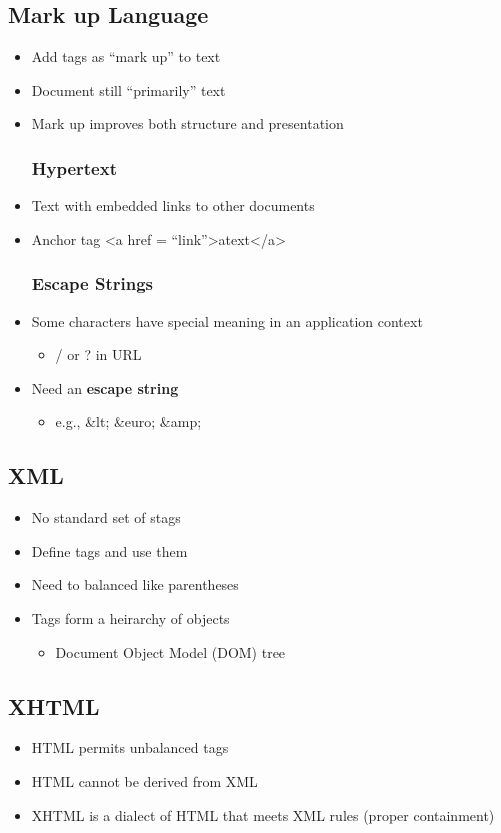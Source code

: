 \subsection{Mark up Language}
\begin{itemize}
	\item Add tags as ``mark up'' to text
	\item Document still ``primarily'' text
	\item Mark up improves both structure and presentation
	\subsubsection{Hypertext}
	\item Text with embedded links to other documents
	\item Anchor tag <a href = ``link''>atext</a>
	\subsubsection{Escape Strings}
	\item Some characters have special meaning in an application context
	\begin{itemize}
		\item / or ? in URL
	\end{itemize}
	\item Need an \textbf{escape string}
	\begin{itemize}
		\item e.g., \&lt; \&euro; \&amp;
	\end{itemize}
\end{itemize}

\subsection{XML}
\begin{itemize}
	\item No standard set of stags
	\item Define tags and use them
	\item Need to balanced like parentheses
	\item Tags form a heirarchy of objects
	\begin{itemize}
		\item Document Object Model (DOM) tree
	\end{itemize}
\end{itemize}

\subsection{XHTML}
\begin{itemize}
	\item HTML permits unbalanced tags
	\item HTML cannot be derived from XML
	\item XHTML is a dialect of HTML that meets XML rules (proper containment)
\end{itemize}

